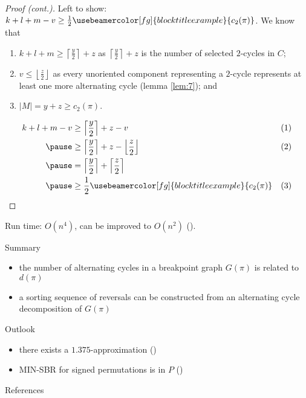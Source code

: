 \documentclass{beamer}
\theoremstyle{definition}
\def\spadding{\vspace{0.25cm}}
\def\g#1{{\usebeamercolor[fg]{block title example}{#1}}}
\begin{document}
\begin{frame}

\begin{proof}[Proof (cont.)]
Left to show: $k+l+m-v \geq \frac{1}{2} \g{c_2(\pi)}$. \pause We know that
\begin{enumerate}
    \item $k+l+m \geq \left\lceil \frac{y}{2} \right\rceil + z$ as $\left\lceil \frac{y}{2} \right\rceil + z$ is the number of selected $2$-cycles in $C$\pause;
    \item $v \leq \left\lfloor \frac{z}{2} \right\rfloor$ as every unoriented component representing a $2$-cycle represents at least one more alternating cycle (lemma \ref{lem:7})\pause; and
    \item $|M| = y+z \geq c_2(\pi)$.
\end{enumerate}\pause
\begin{align*}
    k+l+m-v &\geq \left\lceil \frac{y}{2} \right\rceil + z - v                                          & (1) \\ \pause
            &\geq \left\lceil \frac{y}{2} \right\rceil + z - \left\lfloor \frac{z}{2} \right\rfloor     & (2) \\ \pause
            &= \left\lceil \frac{y}{2} \right\rceil + \left\lceil \frac{z}{2} \right\rceil \\ \pause
            &\geq \frac{1}{2} \g{c_2(\pi)}                                                              & (3)
\end{align*}
\end{proof}

\end{frame}

\begin{frame}

Run time: $O(n^4)$, can be improved to $O(n^2)$ (\citeauthor*{Kaplan1997}).\spadding

\begin{block}{Summary}
\begin{itemize}
    \item the number of alternating cycles in a breakpoint graph $G(\pi)$ is related to $d(\pi)$
    \item a sorting sequence of reversals can be constructed from an alternating cycle decomposition of $G(\pi)$
\end{itemize}
\end{block}

\begin{block}{Outlook}
\begin{itemize}
    \item there exists a $1.375$-approximation (\citeauthor*{Berman2001})
    \item MIN-SBR for signed permutations is in $P$ (\citeauthor*{Hannenhalli1995})
\end{itemize}
\end{block}

\end{frame}

\begin{frame}[allowframebreaks]{References}

\nocite{*}
\printbibliography

\end{frame}
\end{document}
